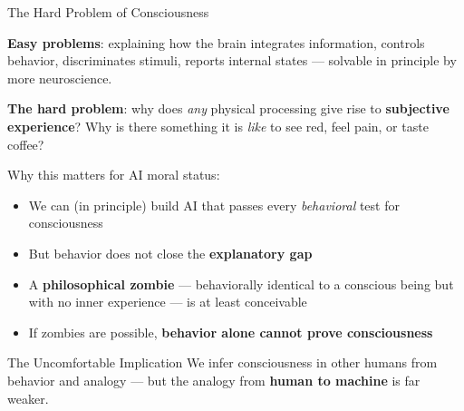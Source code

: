 \documentclass[aspectratio=169,11pt]{beamer}
\begin{document}
\begin{frame}[shrink=5]{The Hard Problem of Consciousness}
\begin{conceptbox}
\small
\textbf{Easy problems}: explaining how the brain integrates information, controls behavior, discriminates stimuli, reports internal states --- solvable in principle by more neuroscience.

\vspace{0.1cm}
\textbf{The hard problem}: why does \emph{any} physical processing give rise to \textbf{subjective experience}? Why is there something it is \emph{like} to see red, feel pain, or taste coffee?
\end{conceptbox}

\vspace{0.15cm}
Why this matters for AI moral status:
\begin{itemize}
    \item We can (in principle) build AI that passes every \emph{behavioral} test for consciousness
    \item But behavior does not close the \textbf{explanatory gap}
    \item A \textbf{philosophical zombie} --- behaviorally identical to a conscious being but with no inner experience --- is at least conceivable
    \item If zombies are possible, \textbf{behavior alone cannot prove consciousness}
\end{itemize}

\begin{alertblock}{The Uncomfortable Implication}
\scriptsize
We infer consciousness in other humans from behavior and analogy --- but the analogy from \textbf{human to machine} is far weaker.
\end{alertblock}
\end{frame}
\end{document}
